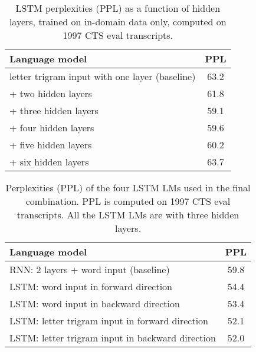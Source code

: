 \documentclass{article}
\begin{document}
\begin{table}[t]
    \centering
    \caption{LSTM perplexities (PPL) as a function of hidden layers, trained on in-domain data only, computed on 1997 CTS eval transcripts.}
\vspace*{0.1in}
	\label{tab:lstmlm-layers}
    \begin{tabular}{|l|c|}
    \hline
	Language model					&  PPL \\
     \hline \hline
	letter trigram input with one layer (baseline) & 63.2 \\ \hline
	\quad + two hidden layers & 61.8 \\ \hline
	\quad + three hidden layers & 59.1 \\ \hline
	\quad + four hidden layers & 59.6 \\ \hline
	\quad + five hidden layers & 60.2 \\ \hline
	\quad + six hidden layers & 63.7 \\ \hline
    \end{tabular}
\vspace*{-0.1in}
\end{table}
\begin{table}[t]
    \centering
    \caption{Perplexities (PPL) of the four LSTM LMs used in the final combination. PPL is computed on 1997 CTS eval transcripts. All the LSTM LMs are with three hidden layers.}
\vspace*{0.1in}
	\label{tab:lstmlm-perfs}
    \begin{tabular}{|l|c|}
    \hline 
	Language model					&  PPL \\
     \hline \hline
	RNN: 2 layers + word input  (baseline) & 59.8 \\ \hline
	LSTM: word input in forward direction & 54.4 \\ \hline
	LSTM: word input in backward direction & 53.4 \\ \hline
	LSTM: letter trigram input in forward direction & 52.1 \\ \hline
	LSTM: letter trigram input in backward direction & 52.0 \\ \hline
    \end{tabular}
\vspace*{-0.1in}
\end{table}
\end{document}
